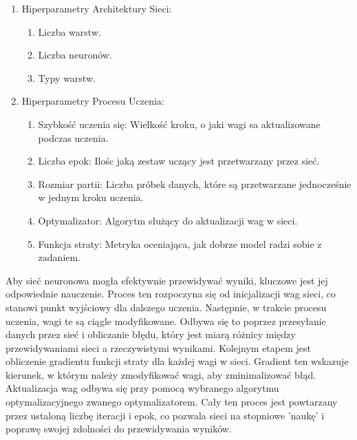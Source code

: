 \documentclass[a4paper,twoside,12pt]{book}
\begin{document}
\begin{enumerate}
  \item Hiperparametry Architektury Sieci:
        \begin{enumerate}
          \item Liczba warstw.
          \item Liczba neuronów.
          \item Typy warstw.
        \end{enumerate}
  \item Hiperparametry Procesu Uczenia:
        \begin{enumerate}
          \item Szybkość uczenia się: Wielkość kroku, o jaki wagi sa aktualizowane podczas uczenia.
          \item Liczba epok: Ilośc jaką zestaw uczący jest przetwarzany przez sieć.
          \item Rozmiar partii: Liczba próbek danych, które są przetwarzane jednocześnie w jednym kroku uczenia.
          \item Optymalizator: Algorytm służący do aktualizacji wag w sieci.
          \item Funkcja straty: Metryka oceniająca, jak dobrze model radzi sobie z zadaniem.
        \end{enumerate}
\end{enumerate}

Aby sieć neuronowa mogła efektywnie przewidywać wyniki, kluczowe jest jej odpowiednie nauczenie. Proces ten rozpoczyna się od inicjalizacji wag sieci, co stanowi punkt wyjściowy dla dalszego uczenia. Następnie, w trakcie procesu uczenia, wagi te są ciągle modyfikowane. Odbywa się to poprzez przesyłanie danych przez sieć i obliczanie błędu, który jest miarą różnicy między przewidywaniami sieci a rzeczywistymi wynikami. Kolejnym etapem jest obliczenie gradientu funkcji straty dla każdej wagi w sieci. Gradient ten wskazuje kierunek, w którym należy zmodyfikować wagi, aby zminimalizować błąd. Aktualizacja wag odbywa się przy pomocą wybranego algorytmu optymalizacyjnego zwanego optymalizatorem. Cały ten proces jest powtarzany przez ustaloną liczbę iteracji i epok, co pozwala sieci na stopniowe 'naukę' i poprawę swojej zdolności do przewidywania wyników.\cite{bib:ksiazka_sieci_algorytmy}
\end{document}
